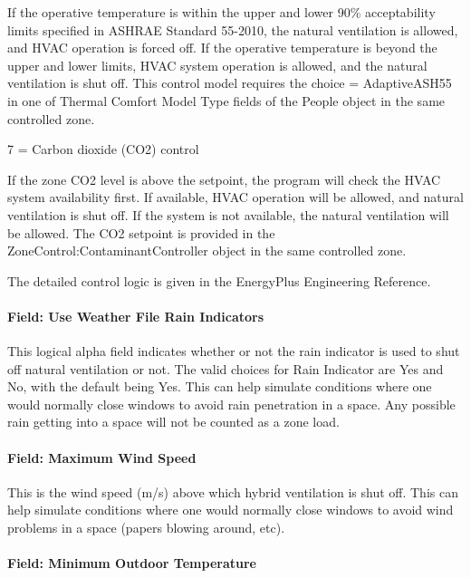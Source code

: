 \begin{description}
  If the operative temperature is within the upper and lower 90\% acceptability limits specified in ASHRAE Standard 55-2010, the natural ventilation is allowed, and HVAC operation is forced off. If the operative temperature is beyond the upper and lower limits, HVAC system operation is allowed, and the natural ventilation is shut off.
  This control model requires the choice = AdaptiveASH55 in one of Thermal Comfort Model Type fields of the People object in the same controlled zone.
  \item
  7 = Carbon dioxide (CO2) control
   
  If the zone CO2 level is above the setpoint, the program will check the HVAC system availability first. If available, HVAC operation will be allowed, and natural ventilation is shut off. If the system is not available, the natural ventilation will be allowed.
  The CO2 setpoint is provided in the ZoneControl:ContaminantController object in the same controlled zone.
\end{description}

The detailed control logic is given in the EnergyPlus Engineering Reference.

\paragraph{Field: Use Weather File Rain Indicators}\label{field-use-weather-file-rain-indicators-000}

This logical alpha field indicates whether or not the rain indicator is used to shut off natural ventilation or not. The valid choices for Rain Indicator are Yes and No, with the default being Yes. This can help simulate conditions where one would normally close windows to avoid rain penetration in a space. Any possible rain getting into a space will not be counted as a zone load.

\paragraph{Field: Maximum Wind Speed}\label{field-maximum-wind-speed-000}

This is the wind speed (m/s) above which hybrid ventilation is shut off. This can help simulate conditions where one would normally close windows to avoid wind problems in a space (papers blowing around, etc).

\paragraph{Field: Minimum Outdoor Temperature}\label{field-minimum-outdoor-temperature-000}

